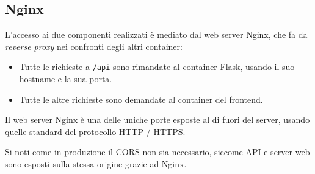 \subsection{Nginx}
L'accesso ai due componenti realizzati è mediato dal web server Nginx, che fa da \emph{reverse proxy} nei confronti degli altri container:
\begin{itemize}
    \item Tutte le richieste a \texttt{/api} sono rimandate al container Flask, usando il suo hostname e la sua porta.
    \item Tutte le altre richieste sono demandate al container del frontend.
\end{itemize}
Il web server Nginx è una delle uniche porte esposte al di fuori del server, usando quelle standard del protocollo HTTP / HTTPS.

\label{cors-deployment}
Si noti come in produzione il CORS non sia necessario, siccome API e server web sono esposti sulla stessa origine grazie ad Nginx.

